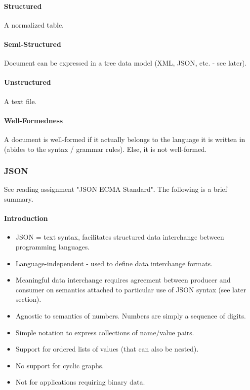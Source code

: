 \paragraph{Structured}
A normalized table.

\paragraph{Semi-Structured}
Document can be expressed in a tree data model (XML, JSON, etc. - see later).

\paragraph{Unstructured}
A text file.

\paragraph{Well-Formedness}
A document is well-formed if it actually belongs to the language it is written in (abides to the syntax / grammar rules). Else, it is not well-formed.


\subsubsection{JSON}

See reading assignment "JSON ECMA Standard". The following is a brief summary.

\paragraph{Introduction}
\begin{itemize}
    \item JSON = text syntax, facilitates structured data interchange between programming languages. 
    \item Language-independent - used to define data interchange formats.
    \item Meaningful data interchange requires agreement between producer and consumer on semantics attached to particular use of JSON syntax (see later section).
    \item Agnostic to semantics of numbers. Numbers are simply a sequence of digits.
    \item Simple notation to express collections of name/value pairs.
    \item Support for ordered lists of values (that can also be nested).
    \item No support for cyclic graphs.
    \item Not for applications requiring binary data.
\end{itemize}

